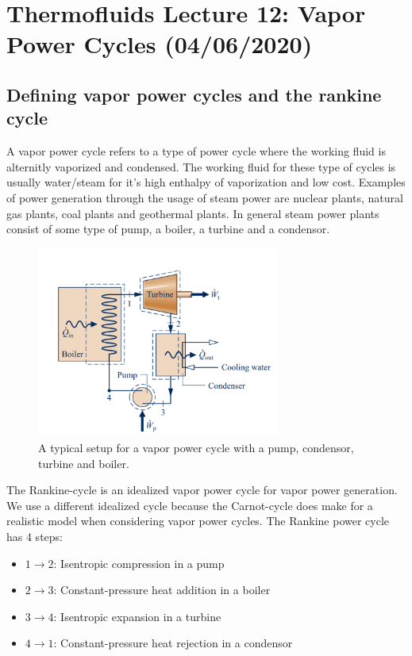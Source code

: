 \documentclass[11pt, a4paper]{article}
\begin{document}
\setcounter{equation}{0}
\setcounter{section}{11}

\section{Thermofluids Lecture 12: Vapor Power Cycles (04/06/2020)}

\subsection{Defining vapor power cycles and the rankine cycle}
A vapor power cycle refers to a type of power cycle where the working fluid is alternitly vaporized and condensed. The working fluid for these type of cycles is usually water/steam for it's high enthalpy of vaporization and low cost. Examples of power generation through the usage of steam power are nuclear plants, natural gas plants, coal plants and geothermal plants. In general steam power plants consist of some type of pump, a boiler, a turbine and a condensor.
\begin{figure}[h]
  \centerline{\includegraphics[width=80mm]{images/Schematic.png}}
  \caption{A typical setup for a vapor power cycle with a pump, condensor, turbine and boiler.}
\end{figure}
The Rankine-cycle is an idealized vapor power cycle for vapor power generation. We use a different idealized cycle because the Carnot-cycle does make for a realistic model when considering vapor power cycles. The Rankine power cycle has 4 steps:
\begin{itemize}
  \item $1 \to 2$: Isentropic compression in a pump
  \item $2 \to 3$: Constant-pressure heat addition in a boiler 
  \item $3 \to 4$: Isentropic expansion in a turbine
  \item $4 \to 1$: Constant-pressure heat rejection in a condensor
\end{itemize}
\end{document}

